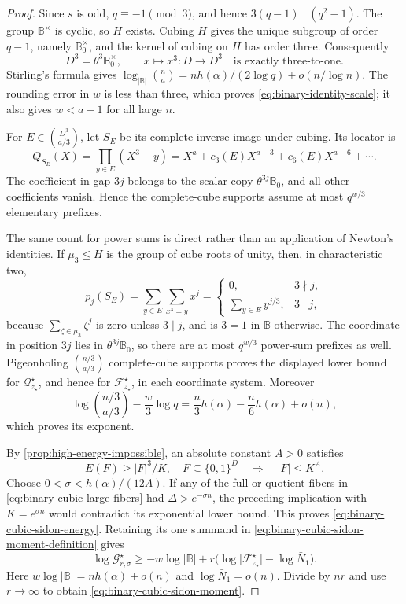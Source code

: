 \documentclass[12pt,a4paper]{amsart}
\numberwithin{equation}{section}
\theoremstyle{remark}
\newcommand{\B}{\mathbb B}
\newcommand{\abs}[1]{\lvert #1\rvert}
\begin{document}
\begin{proof}
Since \(s\) is odd, \(q\equiv-1\pmod3\), and hence
\(3(q-1)\mid(q^2-1)\).  The group \(\B^\times\) is cyclic, so \(H\)
exists.  Cubing \(H\) gives the unique subgroup of order \(q-1\), namely
\(\B_0^\times\), and the kernel of cubing on \(H\) has order three.
Consequently
\[
 D^3=\theta^3\B_0^\times,
 \qquad x\longmapsto x^3:D\longrightarrow D^3
 \quad\text{is exactly three-to-one}.
 \tag{6.11i}\label{eq:binary-cube-domain}
\]
Stirling's formula gives
\(\log_{\abs\B}\binom na=nh(\alpha)/(2\log q)+o(n/\log n)\).
The rounding error in \(w\) is less than three, which proves
\eqref{eq:binary-identity-scale}; it also gives \(w<a-1\) for all large
\(n\).

For \(E\in\binom{D^3}{a/3}\), let \(S_E\) be its complete inverse image
under cubing.  Its locator is
\[
 Q_{S_E}(X)=\prod_{y\in E}(X^3-y)
 =X^a+c_3(E)X^{a-3}+c_6(E)X^{a-6}+\cdots .
 \tag{6.11j}\label{eq:binary-cubic-locator}
\]
The coefficient in gap \(3j\) belongs to the scalar copy
\(\theta^{3j}\B_0\), and all other coefficients vanish.  Hence the
complete-cube supports assume at most \(q^{w/3}\) elementary prefixes.

The same count for power sums is direct rather than an application of
Newton's identities.  If \(\mu_3\le H\) is the group of cube roots of
unity, then, in characteristic two,
\[
 p_j(S_E)=\sum_{y\in E}\sum_{x^3=y}x^j
 =\begin{cases}
 0,&3\nmid j,\\
 \displaystyle\sum_{y\in E}y^{j/3},&3\mid j,
 \end{cases}
 \tag{6.11k}\label{eq:binary-cubic-power-sums}
\]
because \(\sum_{\zeta\in\mu_3}\zeta^j\) is zero unless \(3\mid j\),
and is \(3=1\) in \(\B\) otherwise.  The coordinate in position \(3j\)
lies in \(\theta^{3j}\B_0\), so there are at most \(q^{w/3}\)
power-sum prefixes as well.  Pigeonholing
\(\binom{n/3}{a/3}\) complete-cube supports proves the displayed lower
bound for \(\mathcal Q^\star_{z_\star}\), and hence for
\(\mathcal F^\star_{z_\star}\), in each coordinate system.
Moreover
\[
 \log\binom{n/3}{a/3}-\frac w3\log q
 =\frac n3h(\alpha)-\frac n6h(\alpha)+o(n),
\]
which proves its exponent.

By \cref{prop:high-energy-impossible}, an absolute constant \(A>0\)
satisfies
\[
 E(F)\ge\abs F^3/K,\quad F\subseteq\{0,1\}^D
 \quad\Longrightarrow\quad \abs F\le K^A.
\]
Choose \(0<\sigma<h(\alpha)/(12A)\).  If any of the full or quotient
fibers in \eqref{eq:binary-cubic-large-fibers} had
\(\Delta>e^{-\sigma n}\), the preceding implication with
\(K=e^{\sigma n}\) would contradict its exponential lower bound.
This proves \eqref{eq:binary-cubic-sidon-energy}.  Retaining its one
summand in \eqref{eq:binary-cubic-sidon-moment-definition} gives
\[
 \log\mathcal G^\star_{r,\sigma}
 \ge-w\log\abs\B+
 r\bigl(\log\abs{\mathcal F^\star_{z_\star}}-\log\bar N_1\bigr).
\]
Here \(w\log\abs\B=nh(\alpha)+o(n)\) and
\(\log\bar N_1=o(n)\).  Divide by \(nr\) and use \(r\to\infty\) to obtain
\eqref{eq:binary-cubic-sidon-moment}.


\end{proof}
\end{document}
